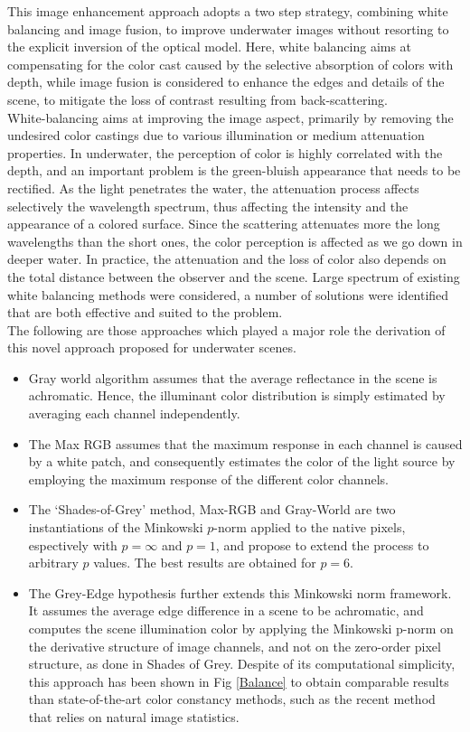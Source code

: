 \documentclass[hidelinks, 12pt]{report}
\begin{document}
\fancyfoot[RE,RO]{\footnotesize\thepage}
 
\justify
This image enhancement approach adopts a two step strategy, combining white balancing and image fusion, to improve underwater images without resorting to the explicit inversion of the optical model. Here, white balancing aims at compensating for the color cast caused by the selective absorption of colors with depth, while image fusion is considered to enhance the edges and details of the scene, to mitigate the loss of contrast resulting from back-scattering.\\ White-balancing aims at improving the image aspect, primarily by removing the undesired color castings due to various illumination or medium attenuation properties. In underwater, the perception of color is highly correlated with the depth, and an important problem is the green-bluish appearance that needs to be rectified. As the light penetrates the water, the attenuation process affects selectively the wavelength spectrum, thus affecting the intensity and the appearance of a colored surface. Since the scattering attenuates more the long wavelengths than the short ones, the color perception is affected as we go down in deeper water. In practice, the attenuation and the loss of color also depends on the total distance between the observer and the scene. Large spectrum of existing white balancing methods were considered, a number of solutions were identified that are both effective and suited to the problem.\\ The following are those approaches which played a major role the derivation of this novel approach proposed for underwater scenes.
\begin{itemize}
\item{Gray world algorithm assumes that the average reflectance in the scene is achromatic. Hence, the illuminant color distribution is simply estimated by averaging each channel independently.}
\item{The Max RGB assumes that the maximum response in each channel is caused by a white patch, and consequently estimates the color of the light source by employing the maximum response of the different color channels.}
\item{The ‘Shades-of-Grey’ method, Max-RGB and Gray-World are two instantiations of the Minkowski $p$-norm applied to the native pixels,  espectively with $p=\infty$ and $p=1$, and propose to extend the process to arbitrary $p$ values. The best results are obtained for $p=6$.}
\item{The Grey-Edge hypothesis further extends this Minkowski norm framework. It assumes the average edge difference in a scene to be achromatic, and computes the scene illumination color by applying the Minkowski p-norm on the derivative structure of image channels, and not on the zero-order pixel structure, as done in Shades of Grey. Despite of its computational simplicity, this approach has been shown in Fig \ref{Balance} to obtain comparable results than state-of-the-art color constancy methods, such as the recent method that relies on natural image statistics.}
\end{itemize}
\end{document}
